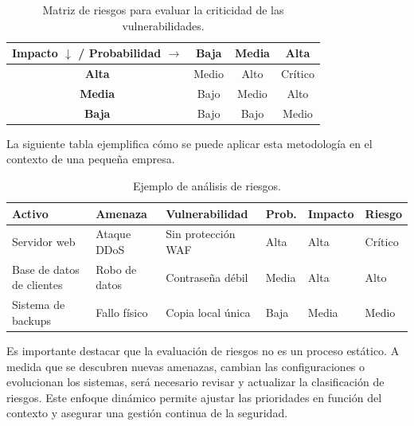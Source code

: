 \documentclass[a4paper, 11pt]{article}
\begin{document}
\begin{table}[H]
\centering\begin{tabular}{|c|c|c|c|}
\hline
\rowcolor[HTML]{D9EAD3}
\textbf{Impacto} $\downarrow$ / \textbf{Probabilidad} $\rightarrow$ & \textbf{Baja} & \textbf{Media} & \textbf{Alta} \\
\hline
\textbf{Alta}   & Medio          & Alto           & Crítico \\
\hline
\textbf{Media}  & Bajo           & Medio          & Alto \\
\hline
\textbf{Baja}   & Bajo           & Bajo           & Medio \\
\hline
\end{tabular}
\caption{Matriz de riesgos para evaluar la criticidad de las vulnerabilidades.}
\end{table}


\vspace{0.3cm}

La siguiente tabla ejemplifica cómo se puede aplicar esta metodología en el contexto de una pequeña empresa.
\vspace{0.3cm}

\begin{table}[H]
\centering
\begin{tabular}{|p{3cm}|p{3cm}|p{3cm}|p{2cm}|p{2cm}|p{2cm}|}
\hline
\rowcolor[HTML]{F4CCCC}
\textbf{Activo} & \textbf{Amenaza} & \textbf{Vulnerabilidad} & \textbf{Prob.} & \textbf{Impacto} & \textbf{Riesgo} \\
\hline
Servidor web & Ataque DDoS & Sin protección WAF & Alta & Alta & Crítico \\
\hline
Base de datos de clientes & Robo de datos & Contraseña débil & Media & Alta & Alto \\
\hline
Sistema de backups & Fallo físico & Copia local única & Baja & Media & Medio \\
\hline
\end{tabular}
\caption{Ejemplo de análisis de riesgos.}
\end{table}

\vspace{0.5cm}


Es importante destacar que la evaluación de riesgos no es un proceso estático. A medida que se descubren nuevas amenazas, 
cambian las configuraciones o evolucionan los sistemas, será necesario revisar y actualizar la clasificación de riesgos. 
Este enfoque dinámico permite ajustar las prioridades en función del contexto y asegurar una gestión continua de la seguridad.
\end{document}
